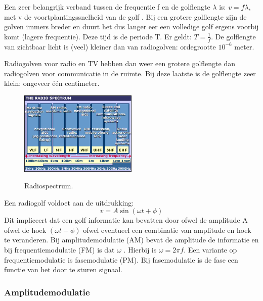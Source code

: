 Een zeer belangrijk verband tussen de frequentie f en de golflengte $\lambda$ is: $v = f\lambda$, met v de voortplantingssnelheid van de golf \cite{elektromagnetischestraling}. Bij een grotere golflengte zijn de golven immers breder en duurt het dus langer eer een volledige golf ergens voorbij komt (lagere frequentie). Deze tijd is de periode T. Er geldt: $T = \frac{1}{f}$. De golflengte van zichtbaar licht is (veel) kleiner dan van radiogolven: ordegrootte $10^{-6}$ meter. 

Radiogolven voor radio en TV hebben dan weer een grotere golflengte dan radiogolven voor communicatie in de ruimte. Bij deze laatste  is de golflengte zeer klein: ongeveer één centimeter. 

\begin{figure}[ht]
  \centering
  \includegraphics[width=0.5\textwidth]{voorbeeld_figuren/radiospectrum}
  \caption{Radiospectrum.} 
  \cite{wavelengths}
  \label{fig:radiospectrum}
\end{figure}

Een radiogolf voldoet aan de uitdrukking: 
\begin{equation*} %
v = A\sin(\omega t+\phi)
\end{equation*}	%
Dit impliceert dat een golf informatie kan bevatten door ofwel de amplitude A ofwel de hoek $(\omega t+\phi)$ ofwel eventueel een combinatie van amplitude en hoek te veranderen. Bij amplitudemodulatie (AM) bevat de amplitude de informatie en bij frequentiemodulatie (FM) is dat $\omega$ \cite{radiowaves1}.  Hierbij is $\omega = 2\pi f$. Een variante op frequentiemodulatie is fasemodulatie (PM). Bij fasemodulatie is de fase een functie van het door te sturen signaal.

\subsubsection{Amplitudemodulatie}


